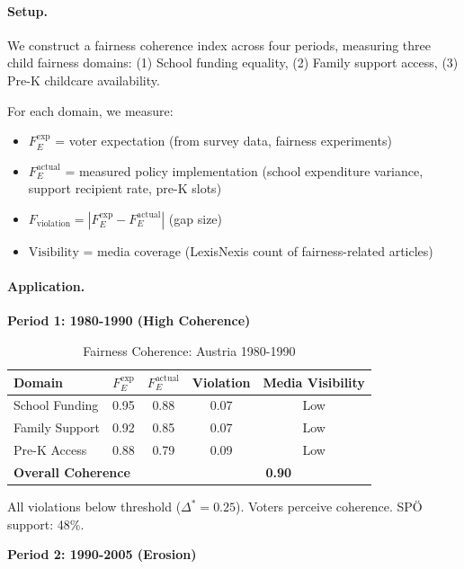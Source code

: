 \paragraph{Setup.} We construct a fairness coherence index across four periods, measuring three
child fairness domains: (1) School funding equality, (2) Family support access, (3) Pre-K childcare availability.

For each domain, we measure:
\begin{itemize}[nosep]
\item $F_E^{\text{exp}}$ = voter expectation (from survey data, fairness experiments)
\item $F_E^{\text{actual}}$ = measured policy implementation (school expenditure variance, support recipient rate, pre-K slots)
\item $F_{\text{violation}} = |F_E^{\text{exp}} - F_E^{\text{actual}}|$ (gap size)
\item $\text{Visibility}$ = media coverage (LexisNexis count of fairness-related articles)
\end{itemize}

\paragraph{Application.}

\textbf{Period 1: 1980-1990 (High Coherence)}

\begin{table}[htbp]
\centering
\caption{Fairness Coherence: Austria 1980-1990}
\label{tab:cm-1980s}
\renewcommand{\arraystretch}{1.3}
\begin{tabular}{@{}lcccc@{}}
\toprule
Domain & $F_E^{\text{exp}}$ & $F_E^{\text{actual}}$ & Violation & Media Visibility \\
\midrule
School Funding & 0.95 & 0.88 & 0.07 & Low \\
Family Support & 0.92 & 0.85 & 0.07 & Low \\
Pre-K Access & 0.88 & 0.79 & 0.09 & Low \\
\midrule
\multicolumn{2}{l}{\textbf{Overall Coherence}} & & \multicolumn{2}{c}{\textbf{0.90}} \\
\bottomrule
\end{tabular}
\end{table}

All violations below threshold ($\Delta^* = 0.25$). Voters perceive coherence. SPÖ support: 48\%.

\textbf{Period 2: 1990-2005 (Erosion)}

